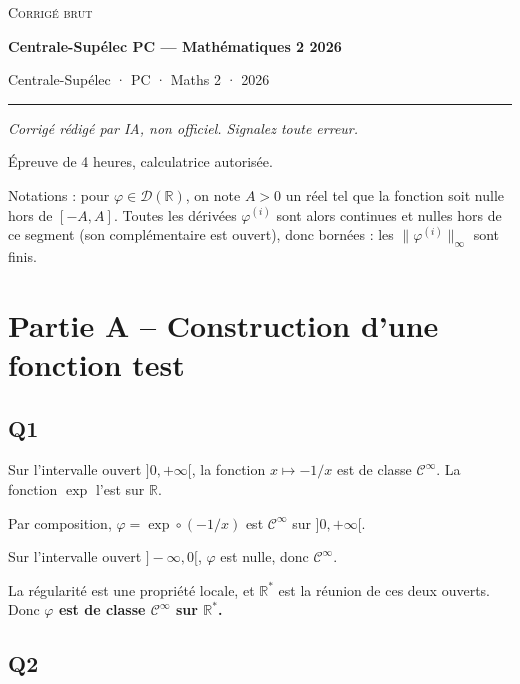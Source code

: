 \documentclass[11pt,a4paper]{article}
\begin{document}
\thispagestyle{plain}
\begin{center}
  {\small\scshape Corrigé brut}\par\smallskip
  {\LARGE\bfseries Centrale-Supélec PC — Mathématiques 2 2026\par}\medskip
  {\large Centrale-Supélec · PC · Maths 2 · 2026\par}
\end{center}
\vspace{2pt}\hrule\vspace{8pt}

\emph{Corrigé rédigé par IA, non officiel. Signalez toute erreur.}

Épreuve de 4 heures, calculatrice autorisée.

Notations : pour \(\varphi\in\mathcal D(\mathbb R)\), on note \(A>0\) un réel tel que la fonction soit nulle hors de \([-A,A]\). Toutes les dérivées \(\varphi^{(i)}\) sont alors continues et nulles hors de ce segment (son complémentaire est ouvert), donc bornées : les \(\|\varphi^{(i)}\|_\infty\) sont finis.

\hypertarget{partie-a-construction-dune-fonction-test}{%
\section{Partie A -- Construction d'une fonction test}\label{partie-a-construction-dune-fonction-test}}

\hypertarget{q1}{%
\subsection{Q1}\label{q1}}

Sur l'intervalle ouvert \(]0,+\infty[\), la fonction \(x\mapsto-1/x\) est de classe \(\mathcal C^\infty\). La fonction \(\exp\) l'est sur \(\mathbb R\).

Par composition, \(\varphi=\exp\circ(-1/x)\) est \(\mathcal C^\infty\) sur \(]0,+\infty[\).

Sur l'intervalle ouvert \(]-\infty,0[\), \(\varphi\) est nulle, donc \(\mathcal C^\infty\).

La régularité est une propriété locale, et \(\mathbb R^*\) est la réunion de ces deux ouverts. Donc \textbf{\(\varphi\) est de classe \(\mathcal C^\infty\) sur \(\mathbb R^*\).}

\hypertarget{q2}{%
\subsection{Q2}\label{q2}}
\end{document}
